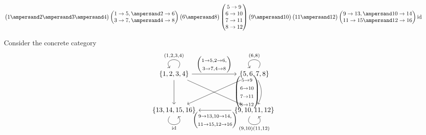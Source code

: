 \[
\begin{pmatrix}1 \ampersand 2 \ampersand 3 \ampersand 4\end{pmatrix}
\begin{pmatrix} 1\to5, \ampersand 2\to6 \\ 3\to7, \ampersand 4\to8 \end{pmatrix}
\begin{pmatrix}6 \ampersand 8\end{pmatrix}
\begin{pmatrix}5\to9\\6\to10\\7\to11\\8\to12\end{pmatrix}
\begin{pmatrix}9\ampersand10\end{pmatrix}\begin{pmatrix}11\ampersand12\end{pmatrix}
\begin{pmatrix}9\to13, \ampersand 10\to14\\11\to15 \ampersand 12\to16\end{pmatrix}
\textup{id}
\]


Consider the concrete category 
\[
\begin{tikzcd}
{\{1,2,3,4\}} \arrow["{(1,2,3,4)}"', loop, distance=2em, in=125, out=55] \arrow[rr, "{\begin{pmatrix} 1\to5, 2\to6, \\ 3\to7, 4\to8 \end{pmatrix}}"] \arrow[dd] \arrow[rrdd] &  & {\{5,6,7,8\}} \arrow["{(6,8)}"', loop, distance=2em, in=125, out=55] \arrow[dd, " \begin{pmatrix}5\to9\\6\to10\\7\to11\\8\to12\end{pmatrix}"', bend left] \arrow[lldd] \\
                                                                                                                                                                             &  &                                                                                                                                                                        \\
{\{13,14,15,16\}} \arrow["\textup{id}"', loop, distance=2em, in=305, out=235]                                                                                                &  & {\{9,10,11,12\}} \arrow["{(9,10)(11,12)}"', loop, distance=2em, in=305, out=235] \arrow[ll, "{\begin{pmatrix}9\to13, 10\to14,\\ 11\to 15, 12\to16\end{pmatrix}}"]     
\end{tikzcd}
\]

